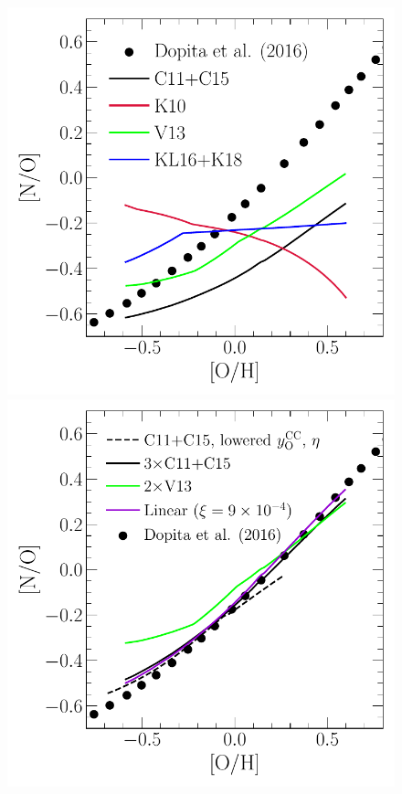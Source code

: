 \documentclass[ms.tex]{subfiles}
\begin{document}
\begin{figure}
\centering
\includegraphics[scale = 0.45]{no_oh_predictions_unmodified.pdf}
\includegraphics[scale = 0.45]{no_oh_predictions.pdf}

\end{figure}
\end{document}
